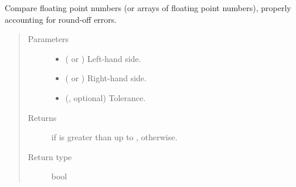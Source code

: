 \documentclass[letterpaper,10pt,english]{sphinxmanual}
\begin{document}
\begin{fulllineitems}
\label{\detokenize{api:utils.greater_than}}
Compare floating point numbers (or arrays of floating point numbers), properly accounting for round-off errors.
\begin{quote}\begin{description}
\item[{Parameters}] \leavevmode\begin{itemize}
\item {} 
 ( or ) \textendash{} Left-hand side.

\item {} 
 ( or ) \textendash{} Right-hand side.

\item {} 
 (, optional) \textendash{} Tolerance.

\end{itemize}

\item[{Returns}] \leavevmode
{} if  is greater than  up to ,  otherwise.

\item[{Return type}] \leavevmode
bool

\end{description}\end{quote}

\end{fulllineitems}

\end{document}
